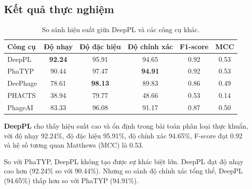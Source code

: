 \subsection*{Kết quả thực nghiệm}

\begin{table}[ht]
\centering
\caption{So sánh hiệu suất giữa DeepPL và các công cụ khác.}
\label{tab:performance_comparison_deeppl}
\begin{tabular}{|l|c|c|c|c|c|}
\hline
\textbf{Công cụ} & \textbf{Độ nhạy} & \textbf{Độ đặc hiệu} & \textbf{Độ chính xác} & \textbf{F1-score} & \textbf{MCC} \\
\hline
DeepPL   & \textbf{92.24}  & 95.91 & 94.65 & 0.92 & 0.53 \\
PhaTYP   & 90.44 & 97.47 & \textbf{94.91} & 0.92 & 0.53 \\
DeePhage & 78.61 & \textbf{98.13} & 89.83 & 0.86 & 0.49 \\
PHACTS   & 38.94 & 79.77 & 48.66 & 0.53 & 0.14 \\
PhageAI  & 83.33 & 96.08 & 91.17 & 0.87 & 0.50 \\
\hline
\end{tabular}
\end{table}

\textbf{DeepPL} cho thấy hiệu suất cao và ổn định trong bài toán phân loại thực khuẩn, với độ nhạy 92.24\%, độ đặc hiệu 95.91\%, độ chính xác 94.65\%, F-score đạt 0.92 và hệ số tương quan Matthews (MCC) là 0.53.

So với PhaTYP, DeepPL không tạo được sự khác biệt lớn. DeepPL đạt độ nhạy cao hơn (92.24\% so với 90.44\%). Nhưng so sánh độ chính xác tổng thể, DeepPL (94.65\%) thấp hơn so với PhaTYP (94.91\%).